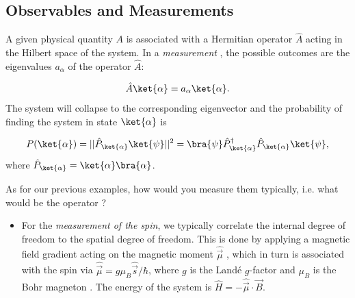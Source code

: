\subsection{Observables and Measurements}

A given physical quantity $A$ is associated with a Hermitian operator $\hat{A}$  acting in the Hilbert space  of the system.
In a \emph{measurement} , the possible outcomes are the eigenvalues $a_\alpha$  of the operator $\hat{A}$:

\begin{align}
				\hat{A}\ket{\alpha}=a_{\alpha}\ket{\alpha}.
			
\end{align}
The system will collapse to the corresponding eigenvector  and the probability of finding the system in state $\ket{\alpha}$ is

\begin{align}
	P(\ket{\alpha})=||\hat{P}_{\ket{\alpha}} \ket{\psi}||^2 = \bra{\psi} \hat{P}^{\dag}_{\ket{\alpha}} \hat{P}_{\ket{\alpha}} \ket{\psi},
\end{align}
where $\hat{P}_{\ket{\alpha}}= \ket{\alpha} \bra{\alpha}$.

As for our previous examples, how would you measure them typically, i.e. what would be the operator ?
\begin{itemize}
\item For the \textit{measurement of the spin}, we typically correlate the internal degree of freedom to the spatial degree of freedom. This is done by applying a magnetic field gradient acting on the magnetic moment $\hat{\vec{\mu}}$ , which in turn is associated with the spin via $\hat{\vec{\mu}} = g \mu_B \hat{\vec{s}}/\hbar$, where $g$ is the Landé $g$-factor  and $\mu_B$ is the Bohr magneton . The energy of the system is $\hat{H} = -\hat{\vec{\mu}} \cdot \vec{B}$.
\end{itemize}
